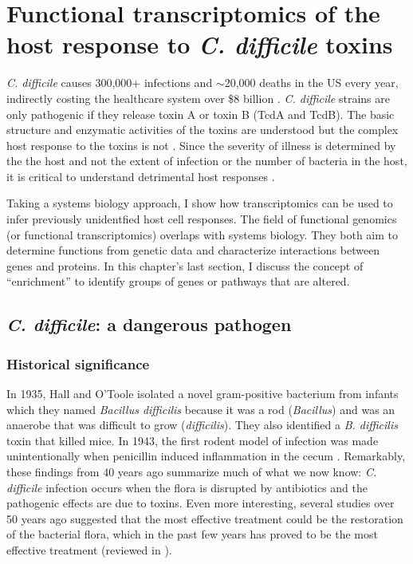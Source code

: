 \chapter[Functional transcriptomics of toxin response]{Functional transcriptomics of the host response to \textit{C. difficile} toxins}\label{chapter:introbmc}

\textit{C. difficile} causes 300,000+ infections and $\sim$20,000 deaths in the US every year,
indirectly costing the healthcare system over \${}8 billion \cite{Lucado:2012wl}.
\textit{C. difficile} strains are only pathogenic if
they release toxin A or toxin B (TcdA and TcdB).
The basic structure and enzymatic activities of the toxins
are understood but the complex host response to the toxins
is not \cite{Pruitt:2010cy,Pruitt:2012kx,Genisyuerek:2011dr,
Just:1995kz,Just:1995ei,Sun:2010kt}. 
Since the severity of illness is determined
by the the host and not the extent of infection
or the number of bacteria in the host, it is critical
to understand detrimental host responses \cite{ElFeghaly:2013gq}.

Taking a systems biology approach, I show how transcriptomics
can be used to infer previously unidentfied host cell responses.
The field of functional genomics (or functional transcriptomics) overlaps
with systems biology. They both aim to determine functions from genetic data
and characterize interactions between genes and proteins. In this chapter's last section, I
discuss the concept of ``enrichment'' to identify
groups of genes or pathways that are altered.

\section{\textit{C. difficile}: a dangerous pathogen}

\subsection{Historical significance}

In 1935, Hall and O'Toole isolated a novel gram-positive bacterium from infants which
they named \textit{Bacillus difficilis} because it was a rod (\textit{Bacillus})
and was an anaerobe that was difficult to grow (\textit{difficilis}). 
They also identified a \textit{B. difficilis} toxin that killed mice.
In 1943, the first rodent model of infection was made unintentionally
when penicillin induced inflammation in the cecum \cite{Hamre:1943te}.
Remarkably, these findings from 40 years ago summarize
much of what we now know: \textit{C. difficile} infection occurs
when the flora is disrupted by antibiotics and the pathogenic
effects are due to toxins. Even more interesting, several
studies over 50 years ago suggested that the most effective treatment
could be the restoration of the bacterial flora, which
in the past few years has proved to be the most effective 
treatment (reviewed in \cite{Bartlett:2008jx}).

